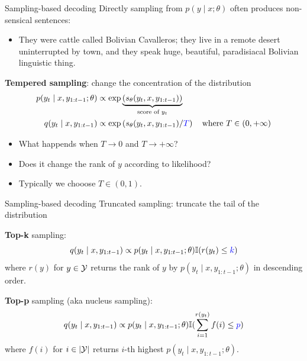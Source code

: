 \documentclass[usenames,dvipsnames,11pt,aspectratio=169]{beamer}
\begin{document}
\begin{frame}
    {Sampling-based decoding}
    Directly sampling from $p(y\mid x; \theta)$ often produces non-sensical sentences:\\
    \begin{itemize}
        \item[] {\footnotesize They were cattle called Bolivian Cavalleros; they live in a remote desert uninterrupted by town, and they speak huge, beautiful, paradisiacal Bolivian linguistic thing.}
    \end{itemize}

    \textbf{Tempered sampling}: change the concentration of the distribution
    \begin{align*}
        p(y_t \mid x, y_{1:t-1}; \theta) &\propto \exp\underbrace{\left( s_\theta(y_t, x, y_{1:t-1}) \right)}_{\text{score of $y_t$}} \\
        q(y_t \mid x, y_{1:t-1}) &\propto \exp\left( s_\theta(y_t,x,y_{1:t-1})/{\color{blue}T} \right) 
        \quad \text{where } T\in(0, +\infty)
    \end{align*}
    \vspace{-2em}
    \begin{itemize}
        \item What happends when $T\to 0$ and $T\to +\infty$?
        \item Does it change the rank of $y$ according to likelihood?
        \item Typically we chooose $T\in (0, 1)$.
    \end{itemize}
\end{frame}

\begin{frame}
    {Sampling-based decoding}
    Truncated sampling: truncate the tail of the distribution
    \vspace{4em}

    \textbf{Top-k} sampling:
    \vspace{-0.5em}
    $$
    q(y_t \mid x, y_{1:t-1}) \propto p(y_t \mid x, y_{1:t-1}; \theta)\mathbb{I}(r(y_t)\le {\color{blue}k})
    $$
    where $r(y)$ for $y\in\mathcal{Y}$ returns the rank of $y$ by $p(y_t \mid x, y_{1:t-1}; \theta)$ in descending order.

    \textbf{Top-p} sampling (aka nucleus sampling):
    \vspace{-1em}
    $$
    q(y_t \mid x, y_{1:t-1}) \propto p(y_t \mid x, y_{1:t-1}; \theta)\mathbb{I}(\sum_{i=1}^{r(y_t)}f(i)\le {\color{blue}p})
    $$
    where $f(i)$ for $i\in|\mathcal{Y}|$ returns $i$-th highest $p(y_t \mid x, y_{1:t-1}; \theta)$.
\end{frame}
\end{document}
